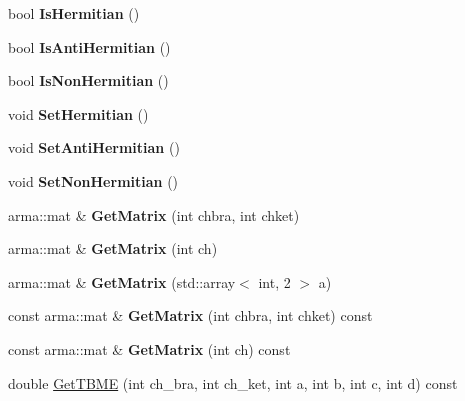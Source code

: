 \begin{DoxyCompactItemize}
bool {\bfseries Is\+Hermitian} ()
\item 
\mbox{\label{classTwoBodyME_aee424b280d0cdfb44fecbf5b0ec5c23d}} 
bool {\bfseries Is\+Anti\+Hermitian} ()
\item 
\mbox{\label{classTwoBodyME_af3a2034735ce16504ca51459e29932e7}} 
bool {\bfseries Is\+Non\+Hermitian} ()
\item 
\mbox{\label{classTwoBodyME_ae3d48007a67b3ab8e97232fd84812dce}} 
void {\bfseries Set\+Hermitian} ()
\item 
\mbox{\label{classTwoBodyME_ab782a80a918095a69189a0f9d2e43e44}} 
void {\bfseries Set\+Anti\+Hermitian} ()
\item 
\mbox{\label{classTwoBodyME_af71f00cd1035917147f048156ee20072}} 
void {\bfseries Set\+Non\+Hermitian} ()
\item 
\mbox{\label{classTwoBodyME_a76241fa6336d763b47f3619e5c4b2963}} 
arma\+::mat \& {\bfseries Get\+Matrix} (int chbra, int chket)
\item 
\mbox{\label{classTwoBodyME_abba656ff6b5773a16424b71fe6f3c73f}} 
arma\+::mat \& {\bfseries Get\+Matrix} (int ch)
\item 
\mbox{\label{classTwoBodyME_a676e0c9ef53e7ad937713b0bb518f94b}} 
arma\+::mat \& {\bfseries Get\+Matrix} (std\+::array$<$ int, 2 $>$ a)
\item 
\mbox{\label{classTwoBodyME_aa2ed0dcf17e0eb7dd38a0c7bf2df8562}} 
const arma\+::mat \& {\bfseries Get\+Matrix} (int chbra, int chket) const
\item 
\mbox{\label{classTwoBodyME_a209a1bcc3286c165b426e33845b1455d}} 
const arma\+::mat \& {\bfseries Get\+Matrix} (int ch) const
\item 
\mbox{\label{classTwoBodyME_a86c81a876ec642f8a28750df4d0c1907}} 
double \hyperlink{classTwoBodyME_a86c81a876ec642f8a28750df4d0c1907}{Get\+T\+B\+ME} (int ch\+\_\+bra, int ch\+\_\+ket, int a, int b, int c, int d) const

\end{DoxyCompactItemize}
